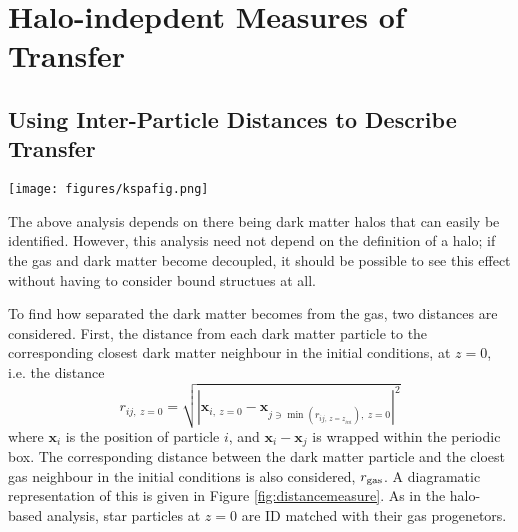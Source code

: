 \section{Halo-indepdent Measures of Transfer}

\subsection{Using Inter-Particle Distances to Describe Transfer}

\begin{figure*} \centering
	\texttt{[image: figures/kspafig.png]} \caption{A
	diagramatic representation of the distance measure. On the left, the
	initial conditions are shown. The blue dark matter particles each find
	their closest dark matter and gas (red) neighbour. These particles are
	then tracked to the final state of the simulation (right) and the
	distances between them calculated again. } \label{fig:distancemeasure}
\end{figure*}

The above analysis depends on there being dark matter halos that can easily be
identified. However, this analysis need not depend on the definition of a halo;
if the gas and dark matter become decoupled, it should be possible to see this
effect without having to consider bound structues at all.

To find how separated the dark matter becomes from the gas, two distances are
considered. First, the distance from each dark matter particle to the
corresponding closest dark matter neighbour in the initial conditions, at
$z=0$, i.e. the distance \begin{equation} r_{ij, ~z=0} = \sqrt{ \left|
\mathbf{x}_{i, ~z=0} - \mathbf{x}_{j \ni \min(r_{ij, ~z=z_{ini}}), ~z=0}
\right|^2 } \label{eqn:minimal} \end{equation} where $\mathbf{x}_i$ is the
position of particle $i$, and $\mathbf{x}_i - \mathbf{x}_j$ is wrapped within
the periodic box. The corresponding distance between the dark matter particle
and the cloest gas neighbour in the initial conditions is also considered,
$r_{\rm gas}$. A diagramatic representation of this is given in Figure
\ref{fig:distancemeasure}. As in the halo-based analysis, star particles at
$z=0$ are ID matched with their gas progenetors.

